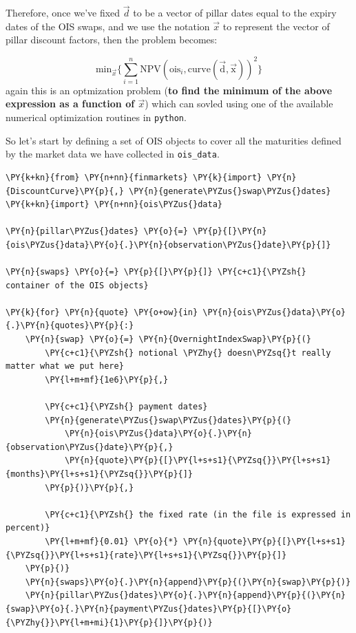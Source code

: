Therefore, once we've fixed \(\vec{d}\) to be a vector of pillar dates equal to the expiry dates of the OIS swaps, and we use the notation \(\vec{x}\) to represent the vector of pillar discount factors, then the problem becomes:

\[\mathrm{min}_{\vec{x}} \Big\{\sum_{i=1}^{n}\mathrm{NPV}(\mathrm{ois}_i, \mathrm{curve(\vec{d}, \vec{x})})^2\Big\}\]
again this is an optmization problem (\textbf{to find the minimum of the above expression as a function of \(\vec{x}\)}) which can sovled using one of the available numerical optimization routines in \texttt{python}.

So let's start by defining a set of OIS objects to cover all the maturities defined by the market data we have collected in \texttt{ois\_data}.

\begin{tcolorbox}[breakable, size=fbox, boxrule=1pt, pad at break*=1mm,colback=cellbackground, colframe=cellborder]
\begin{Verbatim}[commandchars=\\\{\}]
\PY{k+kn}{from} \PY{n+nn}{finmarkets} \PY{k}{import} \PY{n}{DiscountCurve}\PY{p}{,} \PY{n}{generate\PYZus{}swap\PYZus{}dates}
\PY{k+kn}{import} \PY{n+nn}{ois\PYZus{}data}

\PY{n}{pillar\PYZus{}dates} \PY{o}{=} \PY{p}{[}\PY{n}{ois\PYZus{}data}\PY{o}{.}\PY{n}{observation\PYZus{}date}\PY{p}{]}

\PY{n}{swaps} \PY{o}{=} \PY{p}{[}\PY{p}{]} \PY{c+c1}{\PYZsh{} container of the OIS objects}

\PY{k}{for} \PY{n}{quote} \PY{o+ow}{in} \PY{n}{ois\PYZus{}data}\PY{o}{.}\PY{n}{quotes}\PY{p}{:}
    \PY{n}{swap} \PY{o}{=} \PY{n}{OvernightIndexSwap}\PY{p}{(}
        \PY{c+c1}{\PYZsh{} notional \PYZhy{} doesn\PYZsq{}t really matter what we put here}
        \PY{l+m+mf}{1e6}\PY{p}{,}
        
        \PY{c+c1}{\PYZsh{} payment dates}
        \PY{n}{generate\PYZus{}swap\PYZus{}dates}\PY{p}{(}
            \PY{n}{ois\PYZus{}data}\PY{o}{.}\PY{n}{observation\PYZus{}date}\PY{p}{,}
            \PY{n}{quote}\PY{p}{[}\PY{l+s+s1}{\PYZsq{}}\PY{l+s+s1}{months}\PY{l+s+s1}{\PYZsq{}}\PY{p}{]}
        \PY{p}{)}\PY{p}{,}
        
        \PY{c+c1}{\PYZsh{} the fixed rate (in the file is expressed in percent)}
        \PY{l+m+mf}{0.01} \PY{o}{*} \PY{n}{quote}\PY{p}{[}\PY{l+s+s1}{\PYZsq{}}\PY{l+s+s1}{rate}\PY{l+s+s1}{\PYZsq{}}\PY{p}{]}
    \PY{p}{)}
    \PY{n}{swaps}\PY{o}{.}\PY{n}{append}\PY{p}{(}\PY{n}{swap}\PY{p}{)}
    \PY{n}{pillar\PYZus{}dates}\PY{o}{.}\PY{n}{append}\PY{p}{(}\PY{n}{swap}\PY{o}{.}\PY{n}{payment\PYZus{}dates}\PY{p}{[}\PY{o}{\PYZhy{}}\PY{l+m+mi}{1}\PY{p}{]}\PY{p}{)}
    

\end{Verbatim}
\end{tcolorbox}

